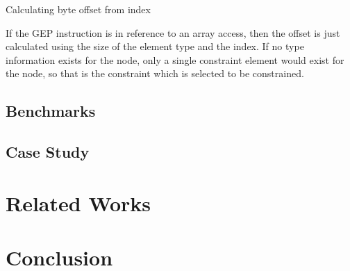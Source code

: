 \documentclass[11pt,a4paper]{article}
\begin{document}
\begin{algorithm}
  \caption{Calculating byte offset from index}
  \label{alg:find_offset}
  
\end{algorithm}

If the GEP instruction is in reference to an array access, then the offset is
just calculated using the size of the element type and the index. If no type
information exists for the node, only a single constraint element would exist
for the node, so that is the constraint which is selected to be constrained. 

\subsection{Benchmarks}

\subsection{Case Study}

\section{Related Works}

\section{Conclusion}
\end{document}
